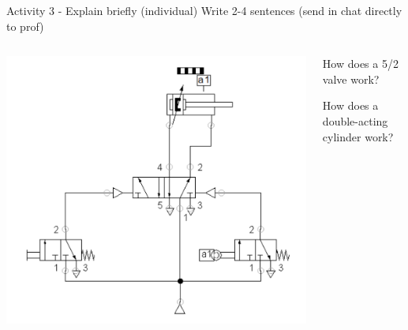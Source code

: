 \documentclass[presentation,aspectratio=1610]{beamer}
\begin{document}
\begin{frame}[label={sec:orgc2cfd6f}]{Activity 3 - Explain briefly (individual)}
Write 2-4 sentences (send in chat directly to prof)
\begin{columns}
\begin{column}{0.4\columnwidth}
\begin{center}
\includegraphics[width=\linewidth]{../../figures/valve-52.png}
\end{center}
\end{column}
\begin{column}{0.6\columnwidth}
\begin{block}{How does a 5/2 valve work?}
\end{block}
\begin{block}{How does a double-acting cylinder work?}
\end{block}
\end{column}
\end{columns}
\end{frame}
\end{document}
